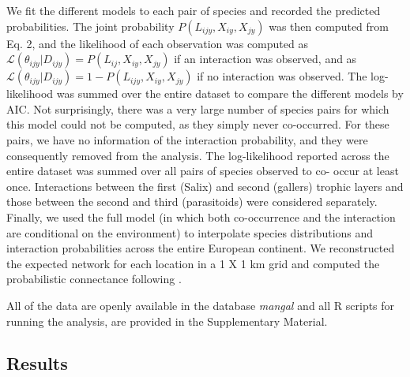 \documentclass[12pt]{article}
\begin{document}
We fit the different models to each pair of species and recorded the predicted
probabilities. The joint probability $P(L_{ijy},X_{iy},X_{jy})$ was then
computed from Eq. 2, and the likelihood of each observation was computed as
$\mathcal{L}(\theta_{ijy}|D_{ijy})=P(L_{ij},X_{iy},X_{jy})$ if an interaction
was observed, and as $\mathcal{L}(\theta_{ijy}|D_{ijy}) = 1-P(L_{ijy}, X_{iy},
X_{jy})$ if no interaction was observed. The log-likelihood was summed over
the entire dataset to compare the different models by AIC. Not surprisingly,
there was a very large number of species pairs for which this model could not
be computed, as they simply never co-occurred. For these pairs, we have no
information of the interaction probability, and they were consequently removed
from the analysis. The log-likelihood reported across the entire dataset was
summed over all pairs of species observed to co- occur at least once.
Interactions between the first (Salix) and second (gallers) trophic layers and
those between the second and third (parasitoids) were considered separately.
Finally, we used the full model (in which both co-occurrence and the
interaction are conditional on the environment) to interpolate species
distributions and interaction probabilities across the entire European
continent. We reconstructed the expected network for each location in a 1 X 1
km grid and computed the probabilistic connectance following
\citep{Poisot2015c}.

All of the data are openly available in the database \emph{mangal}
\citep{Poisot2015b} and all R scripts for running the analysis, are provided
in the Supplementary Material.

\subsection*{Results}
\end{document}
